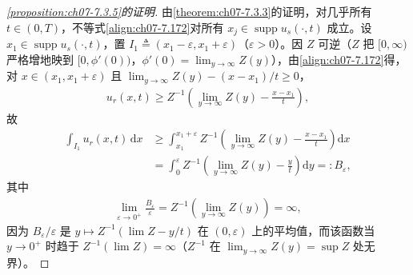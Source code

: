 \documentclass[../../main.tex]{subfiles}%
\begin{document}
\begin{proof}[\cref{proposition:ch07-7.3.5}的证明]
由\cref{theorem:ch07-7.3.3}的证明，对几乎所有 $t\in(0,T)$，不等式\eqref{align:ch07-7.172}对所有 $x_j\in\operatorname{supp}u_s(\cdot,t)$ 成立。设 $x_1\in\operatorname{supp}u_s(\cdot,t)$，置 $I_1\triangleq(x_1-\varepsilon,x_1+\varepsilon)$（$\varepsilon>0$）。因 $Z$ 可逆（$Z$ 把 $[0,\infty)$ 严格增地映到 $[0,\phi'(0))$，$\phi'(0)=\lim_{y\to\infty}Z(y)$），由\eqref{align:ch07-7.172}得，对 $x\in(x_1,x_1+\varepsilon)$ 且 $\lim_{y\to\infty}Z(y)-(x-x_1)/t\geqslant0$，
\begin{align*}
u_r(x,t)\geqslant Z^{-1}\!\left(\lim_{y\to\infty}Z(y)-\frac{x-x_1}{t}\right),
\end{align*}
故
\begin{align*}
\int_{I_1}u_r(x,t)\,\mathrm{d}x&\geqslant\int_{x_1}^{x_1+\varepsilon}Z^{-1}\!\left(\lim_{y\to\infty}Z(y)-\frac{x-x_1}{t}\right)\mathrm{d}x\\
&=\int_0^\varepsilon Z^{-1}\!\left(\lim_{y\to\infty}Z(y)-\frac{y}{t}\right)\mathrm{d}y=:B_\varepsilon,
\end{align*}
其中
\begin{align}
\lim_{\varepsilon\to0^+}\frac{B_\varepsilon}{\varepsilon}=Z^{-1}\!\left(\lim_{y\to\infty}Z(y)\right)=\infty, \label{align:ch07-7.175}
\end{align}
因为 $B_\varepsilon/\varepsilon$ 是 $y\mapsto Z^{-1}(\lim Z-y/t)$ 在 $(0,\varepsilon)$ 上的平均值，而该函数当 $y\to0^+$ 时趋于 $Z^{-1}(\lim Z)=\infty$（$Z^{-1}$ 在 $\lim_{y\to\infty}Z(y)=\sup Z$ 处无界）。


\end{proof}
\end{document}

